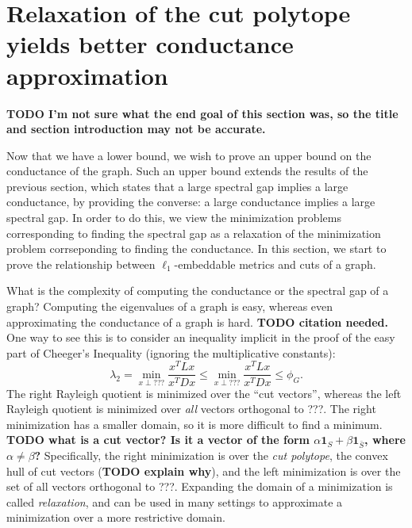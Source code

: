 \documentclass[11pt]{article}
\newcommand{\1}{\mathbf{1}}
\newcommand{\0}{\mathbf{0}}
\begin{document}
\section[Relaxation of the cut polytope yields better conductance approximation]{Relaxation of the cut polytope \\ yields better conductance approximation}

\textbf{TODO I'm not sure what the end goal of this section was, so the title and section introduction may not be accurate.}

Now that we have a lower bound, we wish to prove an upper bound on the conductance of the graph.
Such an upper bound extends the results of the previous section, which states that a large spectral gap implies a large conductance, by providing the converse: a large conductance implies a large spectral gap.
In order to do this, we view the minimization problems corresponding to finding the spectral gap as a relaxation of the minimization problem corrseponding to finding the conductance.
In this section, we start to prove the relationship between $\ell_1$-embeddable metrics and cuts of a graph.


What is the complexity of computing the conductance or the spectral gap of a
graph?  Computing the eigenvalues of a graph is easy, whereas even
approximating the conductance of a graph is hard. \textbf{TODO citation
  needed.}  One way to see this is to consider an inequality implicit in the
proof of the easy part of Cheeger's Inequality (ignoring the multiplicative
constants):
\begin{equation*}
  \lambda_2 = \min_{x \perp ???} \frac{x^T L x}{x^T D x} \leq \min_{x \perp ???} \frac{x^T L x}{x^T D x} \leq \phi_G.
\end{equation*}
The right Rayleigh quotient is minimized over the ``cut vectors'', whereas the left Rayleigh quotient is minimized over \emph{all} vectors orthogonal to ???.
The right minimization has a smaller domain, so it is more difficult to find a minimum.
\textbf{TODO what is a cut vector? Is it a vector of the form $\alpha\1_S + \beta\1_{\bar{S}}$, where $\alpha \neq \beta$?}
Specifically, the right minimization is over the \emph{cut polytope}, the convex hull of cut vectors (\textbf{TODO explain why}), and the left minimization is over the set of all vectors orthogonal to ???.
Expanding the domain of a minimization is called \emph{relaxation}, and can be used in many settings to approximate a minimization over a more restrictive domain.
\end{document}
